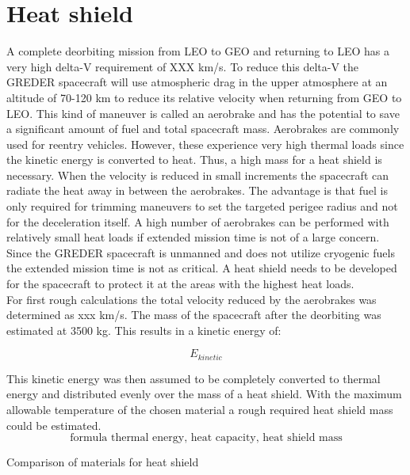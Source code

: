 \chapter{Heat shield}
\qquad A complete deorbiting mission from LEO to GEO and returning to LEO has a very high delta-V requirement of XXX km/s. To reduce this delta-V the GREDER spacecraft will use atmospheric drag in the upper atmosphere at an altitude of 70-120 km to reduce its relative velocity when returning from GEO to LEO. This kind of maneuver is called an aerobrake and has the potential to save a significant amount of fuel and total spacecraft mass. Aerobrakes are commonly used for reentry vehicles. However, these experience very high thermal loads since the kinetic energy is converted to heat. Thus, a high mass for a heat shield is necessary. When the velocity is reduced in small increments the spacecraft can radiate the heat away in between the aerobrakes. The advantage is that fuel is only required for trimming maneuvers to set the targeted perigee radius and not for the deceleration itself. A high number of aerobrakes can be performed with relatively small heat loads if extended mission time is not of a large concern.\\

Since the GREDER spacecraft is unmanned and does not utilize cryogenic fuels the extended mission time is not as critical. A heat shield needs to be developed for the spacecraft to protect it at the areas with the highest heat loads.\\

For first rough calculations the total velocity reduced by the aerobrakes was determined as xxx km/s. The mass of the spacecraft after the deorbiting was estimated at 3500 kg. This results in a kinetic energy of:

\begin{equation}
	E_{kinetic}
\end{equation}

This kinetic energy was then assumed to be completely converted to thermal energy and distributed evenly over the mass of a heat shield. With the maximum allowable temperature of the chosen material a rough required heat shield mass could be estimated.
$$
\text{formula thermal energy, heat capacity, heat shield mass}
$$
\begin{table}
	
	\caption{Comparison of materials for heat shield}
\end{table}

